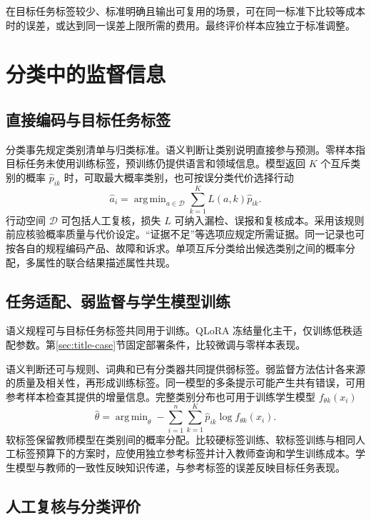 \documentclass[UTF8,a4paper,zihao=-4,fontset=fandol]{ctexart}
\DeclareMathOperator*{\argmin}{arg\,min}
\begin{document}
在目标任务标签较少、标准明确且输出可复用的场景，可在同一标准下比较等成本时的误差，或达到同一误差上限所需的费用。最终评价样本应独立于标准调整。

\section{分类中的监督信息}\label{sec:classification}

\subsection{直接编码与目标任务标签}

分类事先规定类别清单与归类标准。语义判断让类别说明直接参与预测。零样本指目标任务未使用训练标签，预训练仍提供语言和领域信息\citep{yin2019}。模型返回 $K$ 个互斥类别的概率 $\widehat p_{ik}$ 时，可取最大概率类别，也可按误分类代价选择行动
\begin{equation}
 \widehat a_i=\argmin_{a\in\mathcal D}\sum_{k=1}^K L(a,k)\widehat p_{ik}.
 \label{eq:classification}
\end{equation}
行动空间 $\mathcal D$ 可包括人工复核，损失 $L$ 可纳入漏检、误报和复核成本。采用该规则前应核验概率质量与代价设定。“证据不足”等选项应规定所需证据。同一记录也可按各自的规程编码产品、故障和诉求。单项互斥分类给出候选类别之间的概率分配，多属性的联合结果描述属性共现。

\subsection{任务适配、弱监督与学生模型训练}

语义规程可与目标任务标签共同用于训练。QLoRA 冻结量化主干，仅训练低秩适配参数\citep{qlora2023}。第\ref{sec:title-case}节固定部署条件，比较微调与零样本表现。

语义判断还可与规则、词典和已有分类器共同提供弱标签。弱监督方法估计各来源的质量及相关性，再形成训练标签\citep{ratner2017}。同一模型的多条提示可能产生共有错误，可用参考样本检查其提供的增量信息。完整类别分布也可用于训练学生模型 $f_{\theta k}(x_i)$
\begin{equation}
 \widehat\theta=\argmin_\theta
 -\sum_{i=1}^n\sum_{k=1}^K\widehat p_{ik}\log f_{\theta k}(x_i).
 \label{eq:student}
\end{equation}
软标签保留教师模型在类别间的概率分配。比较硬标签训练、软标签训练与相同人工标签预算下的方案时，应使用独立参考标签并计入教师查询和学生训练成本。学生模型与教师的一致性反映知识传递，与参考标签的误差反映目标任务表现。

\subsection{人工复核与分类评价}
\end{document}
